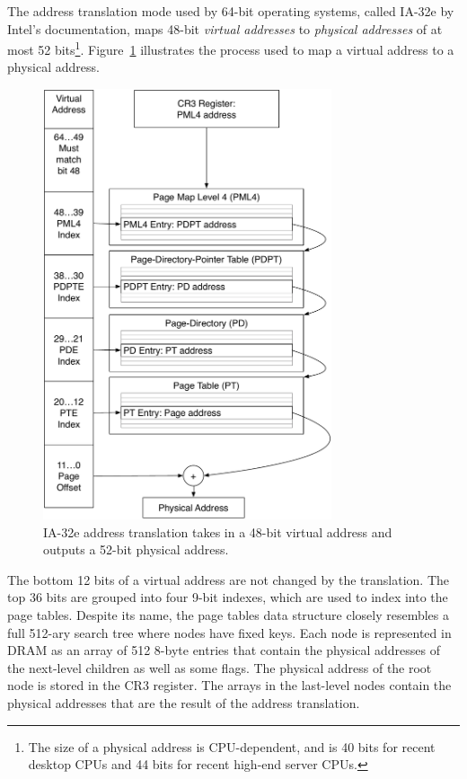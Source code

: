 
The address translation mode used by 64-bit operating systems, called
IA-32e by Intel's documentation, maps 48-bit \textit{virtual addresses} to
\textit{physical addresses} of at most 52 bits\footnote{The size of a
physical address is CPU-dependent, and is 40 bits for recent desktop CPUs and
44 bits for recent high-end server CPUs.}. Figure~\ref{fig:os_paging}
illustrates the process used to map a virtual address to a physical address.

\begin{figure}[hbt]
  \centering
  \includegraphics[width=85mm]{figures/os_paging.pdf}
  \caption{
    IA-32e address translation takes in a 48-bit virtual address and outputs
    a 52-bit physical address.
  }
  \label{fig:os_paging}
\end{figure}

The bottom 12 bits of a virtual address are not changed by the translation. The
top 36 bits are grouped into four 9-bit indexes, which are used to index into
the page tables. Despite its name, the page tables data structure closely
resembles a full 512-ary search tree where nodes have fixed keys. Each
node is represented in DRAM as an array of 512 8-byte entries that contain the
physical addresses of the next-level children as well as some flags. The
physical address of the root node is stored in the CR3 register. The arrays in
the last-level nodes contain the physical addresses that are the result of the
address translation.

